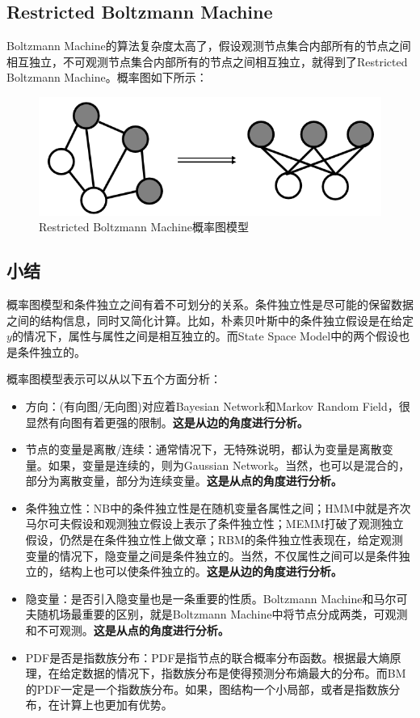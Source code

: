 \documentclass[a4paper]{article}
\begin{document}
\subsection{Restricted Boltzmann Machine}
Boltzmann Machine的算法复杂度太高了，假设观测节点集合内部所有的节点之间相互独立，不可观测节点集合内部所有的节点之间相互独立，就得到了Restricted Boltzmann Machine。概率图如下所示：
\begin{figure}[H]
    \centering
    \includegraphics[width=.55\textwidth]{微信图片_20200229000824.png}
    \caption{Restricted Boltzmann Machine概率图模型}
    
\end{figure}

\subsection{小结}
概率图模型和条件独立之间有着不可划分的关系。条件独立性是尽可能的保留数据之间的结构信息，同时又简化计算。比如，朴素贝叶斯中的条件独立假设是在给定$y$的情况下，属性与属性之间是相互独立的。而State Space Model中的两个假设也是条件独立的。

概率图模型表示可以从以下五个方面分析：
\begin{itemize}
    \item 方向：(有向图/无向图)对应着Bayesian Network和Markov Random Field，很显然有向图有着更强的限制。\textbf{这是从边的角度进行分析。}
    \item 节点的变量是离散/连续：通常情况下，无特殊说明，都认为变量是离散变量。如果，变量是连续的，则为Gaussian Network。当然，也可以是混合的，部分为离散变量，部分为连续变量。\textbf{这是从点的角度进行分析。}
    \item 条件独立性：NB中的条件独立性是在随机变量各属性之间；HMM中就是齐次马尔可夫假设和观测独立假设上表示了条件独立性；MEMM打破了观测独立假设，仍然是在条件独立性上做文章；RBM的条件独立性表现在，给定观测变量的情况下，隐变量之间是条件独立的。当然，不仅属性之间可以是条件独立的，结构上也可以使条件独立的。\textbf{这是从边的角度进行分析。}
    \item 隐变量：是否引入隐变量也是一条重要的性质。Boltzmann Machine和马尔可夫随机场最重要的区别，就是Boltzmann Machine中将节点分成两类，可观测和不可观测。\textbf{这是从点的角度进行分析。}
    \item PDF是否是指数族分布：PDF是指节点的联合概率分布函数。根据最大熵原理，在给定数据的情况下，指数族分布是使得预测分布熵最大的分布。而BM的PDF一定是一个指数族分布。如果，图结构一个小局部，或者是指数族分布，在计算上也更加有优势。
\end{itemize}
\end{document}
